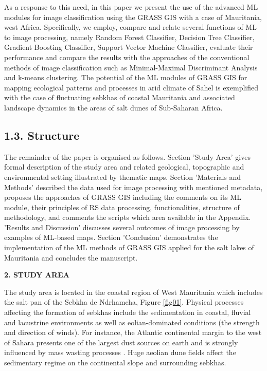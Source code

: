 \documentclass[12pt,a4paper,oneside]{article}
\def \newsection{\vspace{12pt}\textbf}
\def \newpar{\vspace{6pt}}
\begin{document}
\newpar As a response to this need, in this paper we present the use of the advanced ML modules for image classification using the GRASS GIS \citep{GRASS_GIS_software} with a case of Mauritania, west Africa. Specifically, we employ, compare and relate several functions of ML to image processing, namely Random Forest Classifier, Decision Tree Classifier, Gradient Boosting Classifier, Support Vector Machine Classifier, evaluate their performance and compare the results with the approaches of the conventional methods of image classification such as Minimal-Maximal Discriminant Analysis and k-means clustering. The potential of the ML modules of GRASS GIS \citep{NetelerMitasova2002} for mapping ecological patterns and processes in arid climate of Sahel is exemplified with the case of fluctuating sebkhas of coastal Mauritania and associated landscape dynamics in the areas of salt dunes of Sub-Saharan Africa.

\subsection*{1.3. Structure}

\newpar  The remainder of the paper is organised as follows. Section 'Study Area' gives formal description of the study area and related geological, topographic and environmental setting illustrated by thematic maps. Section 'Materials and Methods' described the data used for image processing with mentioned metadata, proposes the approaches of GRASS GIS including the comments on its ML module, their principles of RS data processing, functionalities, structure of methodology, and comments the scripts which area available in the Appendix. 'Results and Discussion' discusses several outcomes of image processing by examples of ML-based maps. Section 'Conclusion' demonstrates the implementation of the ML methods of GRASS GIS applied for the salt lakes of Mauritania and concludes the manuscript.

\newsection {2. STUDY AREA}

\newpar The study area is located in the coastal region of West Mauritania which includes the salt pan of the Sebkha de Ndrhamcha, Figure \ref{fig01}. Physical processes affecting the formation of sebkhas include the sedimentation in coastal, fluvial and lacustrine environments as well as eolian-dominated conditions (the strength and direction of winds). For instance, the Atlantic continental margin to the west of Sahara presents one of the largest dust sources on earth and is strongly influenced by mass wasting processes \citep{HENRICH2010178}. Huge aeolian dune fields affect the sedimentary regime on the continental slope and surrounding sebkhas.
\end{document}

